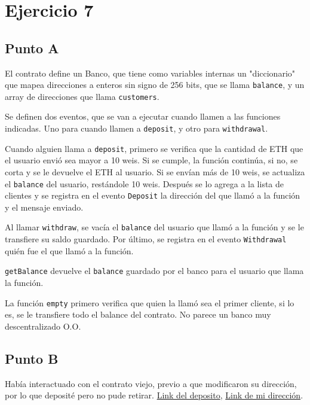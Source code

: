 \documentclass[12pt]{article}
\begin{document}
\section*{Ejercicio 7}

\subsection*{Punto A}

El contrato define un Banco, que tiene como variables internas un "diccionario" que mapea direcciones a enteros sin signo de 256 bits, que se llama \texttt{balance}, y un array de direcciones que llama \texttt{customers}.

Se definen dos eventos, que se van a ejecutar cuando llamen a las funciones indicadas. Uno para cuando llamen a \texttt{deposit}, y otro para \texttt{withdrawal}.

Cuando alguien llama a \texttt{deposit}, primero se verifica que la cantidad de ETH que el usuario envió sea mayor a 10 weis. Si se cumple, la función continúa, si no, se corta y se le devuelve el ETH al usuario. Si se envían más de 10 weis, se actualiza el \texttt{balance} del usuario, restándole 10 weis. Después se lo agrega a la lista de clientes y se registra en el evento \texttt{Deposit} la dirección del que llamó a la función y el mensaje enviado.

Al llamar \texttt{withdraw}, se vacía el \texttt{balance} del usuario que llamó a la función y se le transfiere su saldo guardado. Por último, se registra en el evento \texttt{Withdrawal} quién fue el que llamó a la función.

\texttt{getBalance} devuelve el \texttt{balance} guardado por el banco para el usuario que llama la función.

La función \texttt{empty} primero verifica que quien la llamó sea el primer cliente, si lo es, se le transfiere todo el balance del contrato. No parece un banco muy descentralizado O.O.

\subsection*{Punto B}

Había interactuado con el contrato viejo, previo a que modificaron su dirección, por lo que deposité pero no pude retirar. \href{https://sepolia.etherscan.io/tx/0x47ba314c2d77d78d654640047ee820e476b0f7158053cc97659b3172df354ba2}{Link del deposito}, \href{https://sepolia.etherscan.io/address/0x817c118e1b67f46445912ed4ec45db45b305ef54}{Link de mi dirección}.
\end{document}

